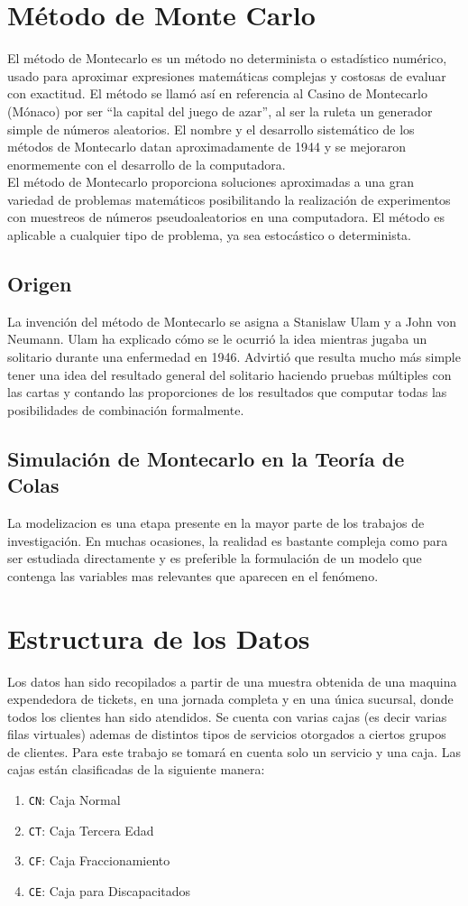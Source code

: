 \documentclass[10pt,letterpaper]{report}
\begin{document}
\section*{Método de Monte Carlo}
El método de Montecarlo​ es un método no determinista o estadístico numérico, usado para aproximar expresiones matemáticas complejas y costosas de evaluar con exactitud. El método se llamó así en referencia al Casino de Montecarlo (Mónaco) por ser ``la capital del juego de azar'', al ser la ruleta un generador simple de números aleatorios. El nombre y el desarrollo sistemático de los métodos de Montecarlo datan aproximadamente de 1944 y se mejoraron enormemente con el desarrollo de la computadora. 
\\${ }$\\
El método de Montecarlo proporciona soluciones aproximadas a una gran variedad de problemas matemáticos posibilitando la realización de experimentos con muestreos de números pseudoaleatorios en una computadora. El método es aplicable a cualquier tipo de problema, ya sea estocástico o determinista.
\subsection*{Origen}
La invención del método de Montecarlo se asigna a Stanislaw Ulam y a John von Neumann. Ulam ha explicado cómo se le ocurrió la idea mientras jugaba un solitario durante una enfermedad en 1946. Advirtió que resulta mucho más simple tener una idea del resultado general del solitario haciendo pruebas múltiples con las cartas y contando las proporciones de los resultados que computar todas las posibilidades de combinación formalmente. 
\subsection*{Simulación de Montecarlo en la Teoría de Colas}
La modelizacion es una etapa presente en la mayor parte de los trabajos de investigación. En muchas ocasiones, la realidad es bastante compleja como para ser estudiada directamente y es preferible la formulación de un modelo que contenga las variables mas relevantes que aparecen en el fenómeno.
\section*{Estructura de los Datos}
Los datos han sido recopilados a partir de una muestra obtenida de una maquina expendedora de tickets, en una jornada completa y en una única sucursal, donde todos los clientes han sido atendidos. Se cuenta con varias cajas (es decir varias filas virtuales) ademas de distintos tipos de servicios otorgados a ciertos grupos de clientes. Para este trabajo se tomará en cuenta solo un servicio y una caja. Las cajas están clasificadas de la siguiente manera: 
\begin{enumerate}
\item \texttt{CN}: Caja Normal
\item \texttt{CT}: Caja Tercera Edad
\item \texttt{CF}: Caja Fraccionamiento
\item \texttt{CE}: Caja para Discapacitados
\end{enumerate}
\end{document}
